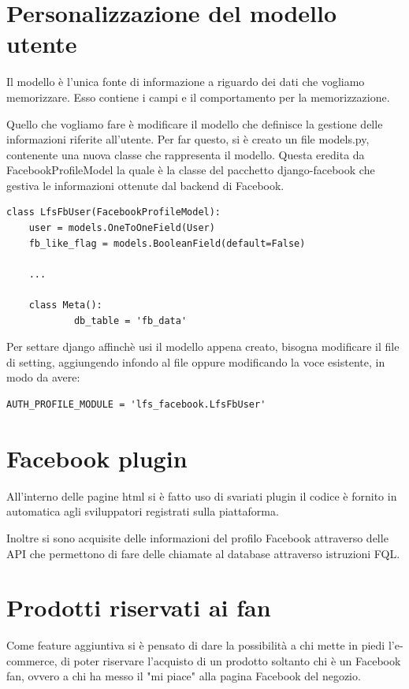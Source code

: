 \section{Personalizzazione del modello utente}
Il modello è l'unica fonte di informazione a riguardo dei dati che vogliamo memorizzare. Esso contiene i campi e il comportamento per la memorizzazione. 

Quello che vogliamo fare è modificare il modello che definisce la gestione delle informazioni riferite all'utente. Per far questo, si è creato un file models.py, contenente una nuova classe che rappresenta il modello. Questa eredita da FacebookProfileModel la quale è la classe del pacchetto django-facebook che gestiva le informazioni ottenute dal backend di Facebook.

\begin{lstlisting}
class LfsFbUser(FacebookProfileModel):
    user = models.OneToOneField(User)
    fb_like_flag = models.BooleanField(default=False)
	
	...	
	
    class Meta():
            db_table = 'fb_data'
\end{lstlisting}

Per settare django affinchè usi il modello appena creato, bisogna modificare il file di setting, aggiungendo infondo al file oppure modificando la voce esistente, in modo da avere:

\begin{lstlisting}
AUTH_PROFILE_MODULE = 'lfs_facebook.LfsFbUser'
\end{lstlisting}


\section{Facebook plugin}
All'interno delle pagine html si è fatto uso di svariati plugin il codice è fornito in automatica agli sviluppatori registrati sulla piattaforma.

Inoltre si sono acquisite delle informazioni del profilo Facebook attraverso delle API che permettono di fare delle chiamate al database attraverso istruzioni FQL.

\section{Prodotti riservati ai fan}
Come feature aggiuntiva si è pensato di dare la possibilità a chi mette in piedi l'e-commerce, di poter riservare l'acquisto di un prodotto soltanto chi è un Facebook fan, ovvero a chi ha messo il "mi piace" alla pagina Facebook del negozio.

